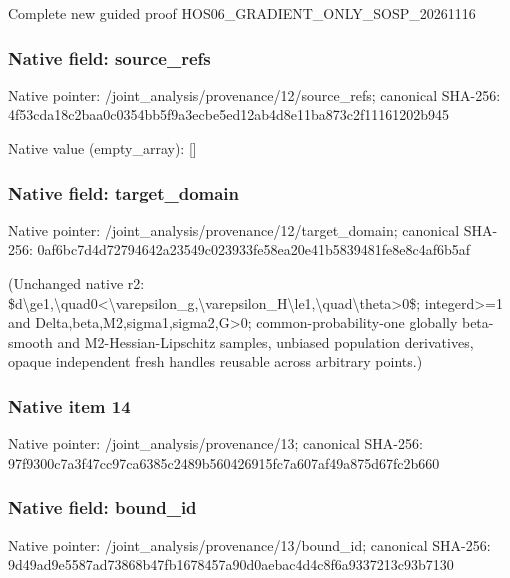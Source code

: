 \documentclass[10pt,a4paper]{article}
\begin{document}
\begingroup\raggedright\sloppy Complete new guided proof HOS06\_\allowbreak{}GRADIENT\_\allowbreak{}ONLY\_\allowbreak{}SOSP\_\allowbreak{}20261116\par\endgroup

\subsubsection{Native field: source\_\allowbreak{}refs}
Native pointer: /joint\_\allowbreak{}analysis/provenance/12/source\_\allowbreak{}refs; canonical SHA-256: 4f53cda18c2baa0c0354bb5f9a3ecbe5ed12ab4d8e11ba873c2f11161202b945

Native value (empty\_\allowbreak{}array): []

\subsubsection{Native field: target\_\allowbreak{}domain}
Native pointer: /joint\_\allowbreak{}analysis/provenance/12/target\_\allowbreak{}domain; canonical SHA-256: 0af6bc7d4d72794642a23549c023933fe58ea20e41b5839481fe8e8c4af6b5af

\begingroup\raggedright\sloppy (Unchanged native r2:\allowbreak{} \$d\textbackslash{}ge1,\allowbreak{}\textbackslash{}quad0<\textbackslash{}varepsilon\_\allowbreak{}g,\allowbreak{}\textbackslash{}varepsilon\_\allowbreak{}H\textbackslash{}le1,\allowbreak{}\textbackslash{}quad\textbackslash{}theta>0\$;\allowbreak{} integerd>=\allowbreak{}1 and Delta,\allowbreak{}beta,\allowbreak{}M2,\allowbreak{}sigma1,\allowbreak{}sigma2,\allowbreak{}G>0;\allowbreak{} common-probability-one globally beta-smooth and M2-Hessian-Lipschitz samples,\allowbreak{} unbiased population derivatives,\allowbreak{} opaque independent fresh handles reusable across arbitrary points.)\par\endgroup

\subsubsection{Native item 14}
Native pointer: /joint\_\allowbreak{}analysis/provenance/13; canonical SHA-256: 97f9300c7a3f47cc97ca6385c2489b560426915fc7a607af49a875d67fc2b660

\subsubsection{Native field: bound\_\allowbreak{}id}
Native pointer: /joint\_\allowbreak{}analysis/provenance/13/bound\_\allowbreak{}id; canonical SHA-256: 9d49ad9e5587ad73868b47fb1678457a90d0aebac4d4c8f6a9337213c93b7130
\end{document}
